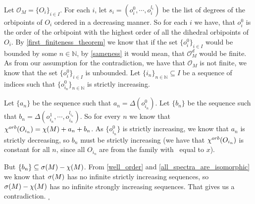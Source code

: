 

Let $\mathcal{O}_M = \{O_i\}_{i \in I}$. 
For each $i$, let $s_i = (o^0_i, \cdots, o^{l_i}_i)$ be the list of degrees of 
the orbipoints  
of $O_i$ ordered in a decreasing manner. 
So for each $i$ we have, that $o^0_i$ is 
the order of the orbipoint with the highest order of all the dihedral orbipoints of 
$O_i$. 
By \ref{first_finiteness_theorem} we know that if the set $\{o^0_i\}_{i \in I}$ 
would be bounded 
by some $n \in \mathbb{N}$, by \ref{sameness} 
it would mean, that $\mathcal{O}_M^d$ would be finite. As 
from our assumption for the contradiction, we have that $\mathcal{O}_M$ is not finite, we know
that the set $\{o^0_i\}_{i \in I}$ is unbounded. 
Let $\{i_n\}_{n\in \mathbb{N}} \subseteq I$ be a sequence of indices such that
$\{o^0_{i_n}\}_{n\in \mathbb{N}}$ is strictly increasing. 

Let $\{a_n\}$ be the sequence such that $a_n = \Delta(o^0_{i_n})$.
Let $\{b_n\}$ be the sequence such that $b_n = \Delta(o^1_{i_n},
\cdots, o^{l_{i_n}}_{i_n})$. 
So for every $n$ we know that ${\chi^{orb}(O_{i_n})} = \chi(M) + a_n + b_n$. As $\{o^0_{i_n}\}$ 
is strictly 
increasing, we know 
that $a_n$ is strictly decreasing, so $b_n$ must be strictly 
increasing  
(we have that ${\chi^{orb}(O_{i_n})}$ is constant for all $n$, since all $O_{i_n}$ 
are from the family with \Eoc\ equal to $x$). 

But $\{b_n\} \subseteq {{\sigma}(M)} - \chi(M)$. 
From \ref{well_order} and \ref{all_spectra_are_isomorphic} we know that ${{\sigma}(M)}$ has no infinite 
strictly increasing sequences, so 
${{\sigma}(M)} - \chi(M)$ has no infinite strongly increasing sequences. That gives us a 
contradiction. 
$_\square$ 



